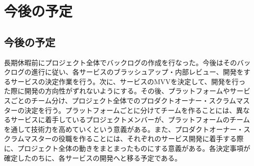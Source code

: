 \chapter{今後の予定}
\section{今後の予定}

長期休暇前にプロジェクト全体でバックログの作成を行なった。今後はそのバックログの進行に従い、各サービスのブラッシュアップ・内部レビュー、開発をするサービスの決定作業を行う。次に、サービスのMVVを決定して、開発を行った際に開発の方向性がずれないようにする。その後、プラットフォームやサービスごとのチーム分け、プロジェクト全体でのプロダクトオーナー・スクラムマスターの決定を行う。プラットフォームごとに分けてチームを作ることには、異なるサービスに着手しているプロジェクトメンバーが、プラットフォームのチームを通して技術力を高めていくという意義がある。また、プロダクトオーナー・スクラムマスターの役職を作ることには、それぞれのサービス開発に着手する際に、プロジェクト全体の動きをまとまったものにする意義がある。各決定事項が確定したのちに、各サービスの開発へと移る予定である。

